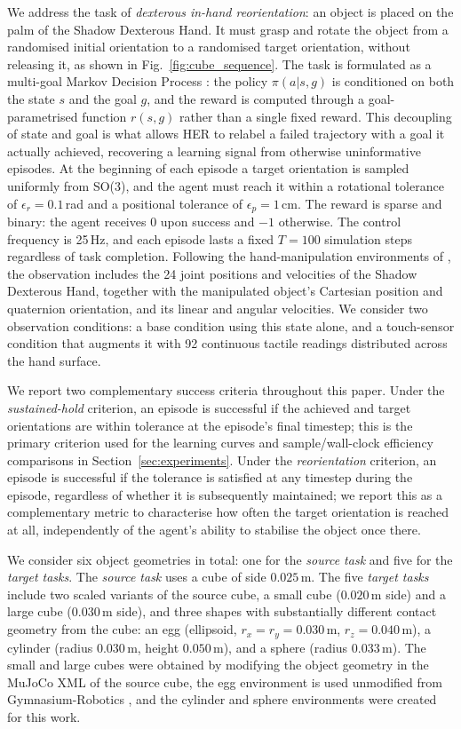 \documentclass[letterpaper, 10 pt, conference]{ieeeconf}  %
\begin{document}
We address the task of \textit{dexterous in-hand reorientation}: an object is placed on the palm of the Shadow Dexterous Hand. It must grasp and rotate the object from a randomised initial orientation to a randomised target orientation, without releasing it, as 
shown in Fig.~\ref{fig:cube_sequence}. The task is formulated as a 
multi-goal Markov Decision Process \cite{c16}: the policy $\pi(a|s,g)$ is conditioned on both the state $s$ and the goal $g$, and the reward is computed through a goal-parametrised function $r(s,g)$ rather than a single fixed reward. This decoupling of state and goal is what allows HER to relabel a failed trajectory with a goal it actually achieved, recovering a learning signal from otherwise uninformative episodes. At the beginning of each episode a
target orientation is sampled uniformly from SO(3), and the agent must
reach it within a rotational tolerance of $\epsilon_r = 0.1$\,rad and a
positional tolerance of $\epsilon_p = 1$\,cm. The reward is sparse and
binary: the agent receives $0$ upon success and $-1$ otherwise. The
control frequency is 25\,Hz, and each episode lasts a fixed $T = 100$
simulation steps regardless of task completion. Following the hand-manipulation environments of \cite{c16}, the observation includes the 24 joint positions and velocities of the Shadow Dexterous Hand, together with the manipulated object's Cartesian position and quaternion orientation, and its linear and angular velocities. We consider two observation conditions: a base condition using this state alone, and a touch-sensor condition that augments it with 92 continuous tactile readings distributed across the hand surface.

We report two complementary success criteria throughout this paper.
Under the \emph{sustained-hold} criterion, an episode is successful if
the achieved and target orientations are within tolerance at the
episode's final timestep; this is the primary criterion used for the
learning curves and sample/wall-clock efficiency comparisons in
Section~\ref{sec:experiments}. Under the \emph{reorientation} criterion, an episode is
successful if the tolerance is satisfied at any timestep during the
episode, regardless of whether it is subsequently maintained; we report
this as a complementary metric to characterise how often the target
orientation is reached at all, independently of the agent's ability to
stabilise the object once there.

We consider six object geometries in total: one for the \textit{source task} and five for the \textit{target tasks}. The \textit{source task} uses a cube of side $0.025$\,m. The five \textit{target tasks} include two scaled variants of the source cube, a small cube ($0.020$\,m side) and a large cube ($0.030$\,m side), and three shapes with substantially different contact geometry from the cube: an egg (ellipsoid, $r_x = r_y = 0.030$\,m, $r_z = 0.040$\,m), a cylinder (radius $0.030$\,m, height $0.050$\,m), and a sphere (radius $0.033$\,m). The small and large cubes were obtained by modifying the object geometry in the MuJoCo XML of the source cube, the egg environment is used unmodified from Gymnasium-Robotics \cite{c18}, and the cylinder and sphere environments were created for this work.
\end{document}
